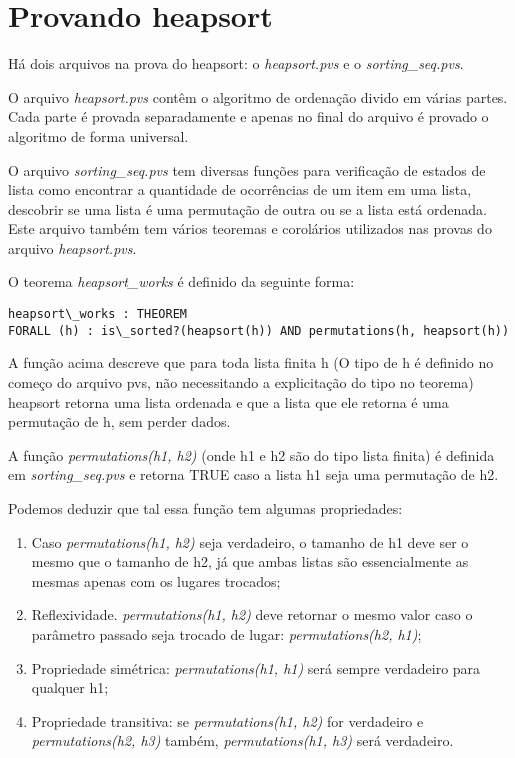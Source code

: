 \section{Provando heapsort}

Há dois arquivos na prova do heapsort: o \textit{heapsort.pvs} e o \textit{sorting\_seq.pvs}.

O arquivo \textit{heapsort.pvs} contêm o algoritmo de ordenação divido em várias partes. Cada parte é provada separadamente e apenas no final do arquivo é provado o algoritmo de forma universal.

O arquivo \textit{sorting\_seq.pvs} tem diversas funções para verificação de estados de lista como encontrar a quantidade de ocorrências de um item em uma lista, descobrir se uma lista é uma permutação de outra ou se a lista está ordenada. Este arquivo também tem vários teoremas e corolários utilizados nas provas do arquivo \textit{heapsort.pvs}.

O teorema \textit{heapsort\_works} é definido da seguinte forma:

\begin{verbatim}
heapsort\_works : THEOREM 
FORALL (h) : is\_sorted?(heapsort(h)) AND permutations(h, heapsort(h))
\end{verbatim}

A função acima descreve que para toda lista finita h (O tipo de h é definido no começo do arquivo pvs, não necessitando a explicitação do tipo no teorema) heapsort retorna uma lista ordenada e que a lista que ele retorna é uma permutação de h, sem perder dados.

A função \textit{permutations(h1, h2)} (onde h1 e h2 são do tipo lista finita) é definida em \textit{sorting\_seq.pvs} e retorna TRUE caso a lista h1 seja uma permutação de h2. 

Podemos deduzir que tal essa função tem algumas propriedades:

\begin{enumerate}
    \item \label{lemma2} Caso \textit{permutations(h1, h2)} seja verdadeiro, o tamanho de h1 deve ser o mesmo que o tamanho de h2, já que ambas listas são essencialmente as mesmas apenas com os lugares trocados;
    \item \label{reflex} Reflexividade. \textit{permutations(h1, h2)} deve retornar o mesmo valor caso o parâmetro passado seja trocado de lugar: \textit{permutations(h2, h1)};
    \item \label{symetry} Propriedade simétrica: \textit{permutations(h1, h1)} será sempre verdadeiro para qualquer h1;
    \item \label{trans} Propriedade transitiva: se \textit{permutations(h1, h2)} for verdadeiro e \textit{permutations(h2, h3)} também, \textit{permutations(h1, h3)} será verdadeiro.
\end{enumerate}

